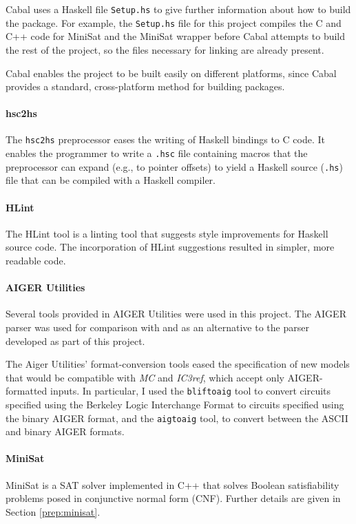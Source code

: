 \documentclass[12pt,a4paper,twoside,openright]{report}
\begin{document}
{{Cabal uses a Haskell file \verb,Setup.hs, to give further information
about how to build the package. For example, the \verb,Setup.hs, file
for this project compiles the C and C++ code for MiniSat and the MiniSat
wrapper before Cabal attempts to build the rest of the project, so the
files necessary for linking are already present.

Cabal enables the project to be built easily on different platforms,
since Cabal provides a standard, cross-platform method for building packages.}

\paragraph{hsc2hs}{
The \verb,hsc2hs, preprocessor \cite{hsc2hs} eases the writing of Haskell bindings to C
code.
It enables the programmer to write a \verb,.hsc, file containing
macros that the preprocessor can expand (e.g., to pointer offsets)
to yield a Haskell source (\verb,.hs,) file that can be compiled with a
Haskell compiler.
}

\paragraph{HLint}{
The HLint tool \cite{hlint} is a linting tool that suggests style improvements for
Haskell source code.
The incorporation of HLint suggestions resulted in simpler, more readable code.
}

\paragraph{AIGER Utilities}{
Several tools provided in AIGER Utilities \cite{aiger} were used in this project.
The
AIGER parser was used for comparison with and as an alternative
to the parser developed as part of this project. 

The Aiger Utilities' format-conversion tools
eased the specification of new models that would
be compatible with \emph{MC} and \emph{IC3ref},
which accept only AIGER-formatted inputs.
In particular, I used the {\tt bliftoaig}
tool to convert circuits specified using the Berkeley Logic Interchange Format
to circuits specified using the binary AIGER format, and the {\tt aigtoaig} tool,
to convert between the ASCII and binary AIGER formats. }

\paragraph{MiniSat}{
MiniSat \cite{minisat,een05}
is a SAT solver implemented in C++ that solves Boolean satisfiability problems
posed in conjunctive normal form (CNF). Further details are given in Section \ref{prep:minisat}.
}

}
\end{document}
